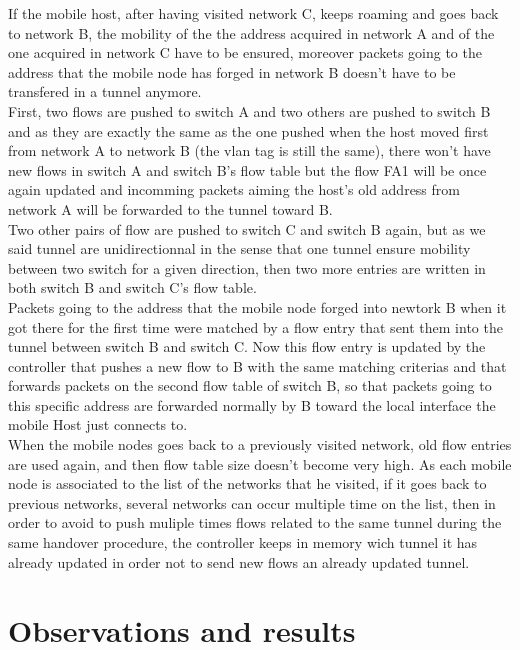 \documentclass{article}
\begin{document}
If the mobile host, after having visited network C, keeps roaming and
goes back to network B, the mobility of the the address acquired in
network A and of the one acquired in network C have to be ensured,
moreover packets going to the address that the mobile node has forged
in network B doesn't have to be transfered in a tunnel anymore.\\
\newline
First, two flows are pushed to switch A and two others are pushed to
switch B and as they are exactly the same as the one pushed when the
host moved first from network A to network B (the vlan tag is still
the same), there won't have new flows in switch A and switch B's flow
table but the flow FA1 will be once again updated and incomming
packets aiming the host's old address from network A will be
forwarded to the tunnel toward B.\\
\newline
Two other pairs of flow are pushed to switch C and switch B again,
but as we said tunnel are unidirectionnal in the sense that one
tunnel ensure mobility between two switch for a given direction, then
two more entries are written in both switch B and switch C's flow
table.\\
\newline
Packets going to the address that the mobile node forged into newtork
B when it got there for the first time were matched by a flow entry
that sent them into the tunnel between switch B and switch C. Now
this flow entry is updated by the controller that pushes a new flow to
B with the same matching criterias and that forwards packets on the
second flow table of switch B, so that packets going to this specific
address are forwarded normally by B toward the local interface the
mobile Host just connects to. \\
\newline
When the mobile nodes goes back to a previously visited network, old
flow entries are used again, and then flow table size doesn't become
very high. As each mobile node is associated to the list of the
networks that he visited, if it goes back to previous networks,
several networks can occur multiple time on the list, then in order to
avoid to push muliple times flows related to the same tunnel during
the same handover procedure, the controller keeps in memory wich
tunnel it has already updated in order not to send new flows an
already updated tunnel.\\
\newline
\section{Observations and results} 
\end{document}
